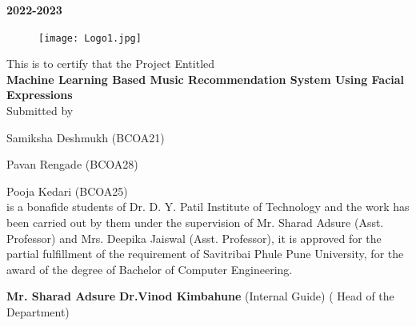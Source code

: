 \documentclass[12pt]{report}
\begin{document}
\large \textbf  {2022-2023}\\
\vspace{0.5 cm}

\clearpage


\begin{figure}[h]
\centering
\texttt{[image: Logo1.jpg]}
\end{figure}

\vspace{0.3 cm}

\vspace{0.4 cm}

\normalsize{This is to certify that the Project Entitled}\\
\vspace{0.3cm}
\large\textbf{Machine Learning Based Music Recommendation
System Using Facial Expressions}\\
\vspace{0.3 cm}
\normalsize{Submitted by}\\
\vspace{0.3 cm}

\normalsize  {Samiksha Deshmukh (BCOA21)}

\normalsize {Pavan Rengade (BCOA28) }

\normalsize {Pooja Kedari (BCOA25)}
\vspace{0.2 cm}\\
\justifying
\setlength{\parindent}{4em}
\setlength{\parskip}{1em}
\renewcommand{\baselinestretch}{1.5}
\normalsize
is a bonafide students of Dr. D. Y. Patil Institute of Technology and the work has been carried 
out by them under the supervision of Mr. Sharad Adsure (Asst. Professor) and Mrs. 
Deepika Jaiswal (Asst. Professor), it is approved for the partial fulfillment of the 
requirement of Savitribai Phule Pune University, for the award of the degree of Bachelor of Computer
Engineering.

\vspace{0.4 cm}
\setlength{\parindent}{0 em}
 \textbf{Mr. Sharad Adsure}  \hspace{6.9cm}          \textbf{ Dr.Vinod Kimbahune  }   \hspace{5.5cm}         
\centering
(Internal Guide)    \hspace{6.9 cm}  ( Head of the Department)  \hspace{1 cm}    \\
\end{document}
